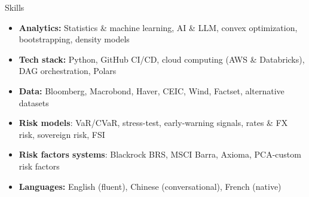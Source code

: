 \documentclass[usegeometry, 10pt, a4paper]{cv} %
\begin{document}
\begin{rubriquetableau}[0.98\textwidth]{Skills}
  \vspace{-0.5cm}  
  \begin{itemize}
    \item \textbf{Analytics:} Statistics \& machine learning, AI \& LLM, convex optimization, bootstrapping, density models 
    \item \textbf{Tech stack:} Python, GitHub CI/CD, cloud computing (AWS \& Databricks), DAG orchestration, Polars
    \item \textbf{Data:} Bloomberg, Macrobond, Haver, CEIC, Wind, Factset, alternative datasets
    \item \textbf{Risk models}: VaR/CVaR, stress-test, early-warning signals, rates \& FX risk, sovereign risk, FSI 
    \item \textbf{Risk factors systems}: Blackrock BRS, MSCI Barra, Axioma, PCA-custom risk factors
    \item \textbf{Languages:} English (fluent), Chinese (conversational), French (native) 
  \end{itemize}
  \end{rubriquetableau}


\end{document}
